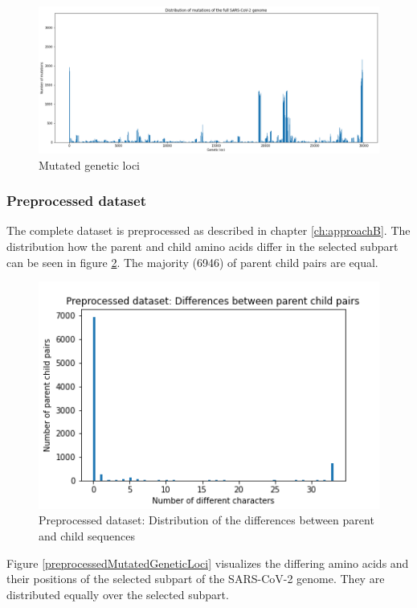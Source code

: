 \begin{figure}[ht!]
	\centering
	\includegraphics[width=1.0\linewidth]{figures/mutatedGeneticLoci.png}
	\caption{Mutated genetic loci \cite{own representation}}
	\label{mutatedGeneticLoci}
\end{figure}

\newpage
\subsubsection{Preprocessed dataset}  \label{ch:experimentsAb}

The complete dataset is preprocessed as described in chapter \ref{ch:approachB}. The distribution how the parent and child amino acids differ in the selected subpart can be seen in figure \ref{preprocessedDistributionDifferencesParentChild}. The majority (6946) of parent child pairs are equal.

\begin{figure}[ht]
	\centering
	\includegraphics[width=0.6\linewidth]{figures/preprocessedDistributionDifferencesParentChild.png}
	\caption{Preprocessed dataset: Distribution of the differences between parent and child sequences \cite{own representation}}
	\label{preprocessedDistributionDifferencesParentChild}
\end{figure}

Figure \ref{preprocessedMutatedGeneticLoci} visualizes the differing amino acids and their positions of the selected subpart of the \ac{SARS-CoV-2} genome. They are distributed equally over the selected subpart.

